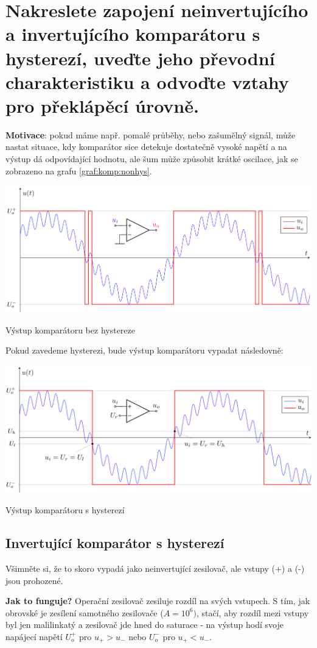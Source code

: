\documentclass[a4paper,12pt]{article}   %
\begin{document}
\section{Nakreslete zapojení neinvertujícího a invertujícího komparátoru s hysterezí, uveďte jeho převodní charakteristiku a odvoďte vztahy pro překlápěcí úrovně.}
\textbf{Motivace}: pokud máme např. pomalé průběhy, nebo zašumělný signál, může nastat situace, kdy komparátor sice detekuje dostatečně vysoké napětí a na výstup dá odpovídající hodnotu, ale šum může způsobit krátké oscilace, jak se zobrazeno na grafu \ref{graf:komp:nonhys}.
\begin{graf}
    \centering
    \includegraphics[width=.7\textwidth]{komparator-nehyst-graf.PNG}
    \caption{Výstup komparátoru bez hystereze}
    \label{graf:komp:nonhys}
\end{graf}

Pokud zavedeme hysterezi, bude výstup komparátoru vypadat následovně:
\begin{graf}
    \centering
    \includegraphics[width=.7\textwidth]{komparator-hyst-graf.PNG}
    \caption{Výstup komparátoru s hysterezí}
    \label{graf:komp:hyst}
\end{graf}

\subsection*{Invertující komparátor s hysterezí}
Všimněte si, že to skoro vypadá jako neinvertující zesilovač, ale vstupy (+) a (-) jsou prohozené.

\textbf{Jak to funguje?} Operační zesilovač zesiluje rozdíl na svých vstupech. S tím, jak obrovské je zesílení samotného zesilovače ($A = 10^6)$, stačí, aby rozdíl mezi vstupy byl jen malilinkatý a zesilovač jde hned do saturace - na výstup hodí svoje napájecí napětí $U_o^+$ pro $u_+ > u_-$ nebo $U_o^-$ pro $u_+ < u_-$.
\end{document}
